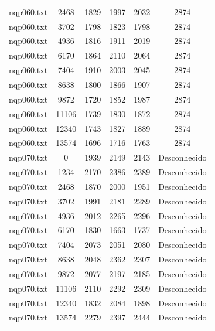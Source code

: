 \documentclass[12pt]{article}
\begin{document}
{\begin{longtable}{c|c|cccc}
		nqp060.txt    &   2468    &   1829   &   1997   &   2032   & 2874       \\
		nqp060.txt    &   3702    &   1798   &   1823   &   1798   & 2874       \\
		nqp060.txt    &   4936    &   1816   &   1911   &   2019   & 2874       \\
		nqp060.txt    &   6170    &   1864   &   2110   &   2064   & 2874       \\
		nqp060.txt    &   7404    &   1910   &   2003   &   2045   & 2874       \\
		nqp060.txt    &   8638    &   1800   &   1866   &   1907   & 2874       \\
		nqp060.txt    &   9872    &   1720   &   1852   &   1987   & 2874       \\
		nqp060.txt    &   11106   &   1739   &   1830   &   1872   & 2874       \\
		nqp060.txt    &   12340   &   1743   &   1827   &   1889   & 2874       \\
		nqp060.txt    &   13574   &   1696   &   1716   &   1763   & 2874       \\ \hline
		nqp070.txt    &   0       &   1939   &   2149   &   2143   & Desconhecido \\
		nqp070.txt    &   1234    &   2170   &   2386   &   2389   & Desconhecido \\
		nqp070.txt    &   2468    &   1870   &   2000   &   1951   & Desconhecido \\
		nqp070.txt    &   3702    &   1991   &   2181   &   2289   & Desconhecido \\
		nqp070.txt    &   4936    &   2012   &   2265   &   2296   & Desconhecido \\
		nqp070.txt    &   6170    &   1830   &   1663   &   1737   & Desconhecido \\
		nqp070.txt    &   7404    &   2073   &   2051   &   2080   & Desconhecido \\
		nqp070.txt    &   8638    &   2048   &   2362   &   2307   & Desconhecido \\
		nqp070.txt    &   9872    &   2077   &   2197   &   2185   & Desconhecido \\
		nqp070.txt    &   11106   &   2110   &   2292   &   2309   & Desconhecido \\
		nqp070.txt    &   12340   &   1832   &   2084   &   1898   & Desconhecido \\
		nqp070.txt    &   13574   &   2279   &   2397   &   2444   & Desconhecido \\ \hline

\end{longtable}}
\end{document}
